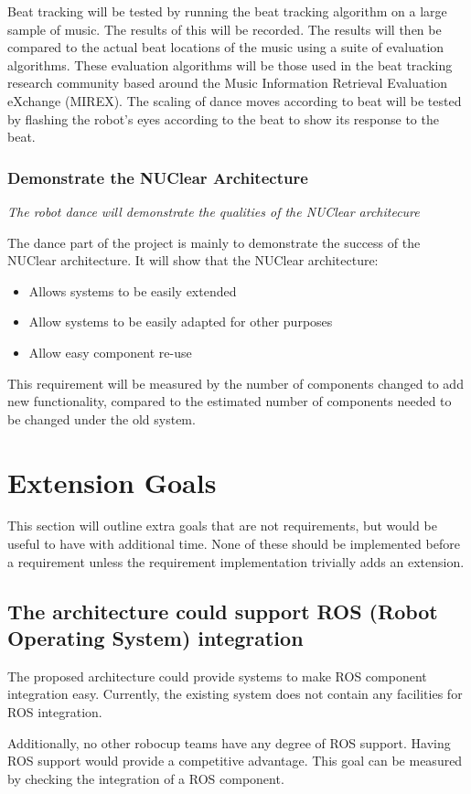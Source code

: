 \documentclass[english,12pt]{scrartcl}
\newcommand{\requirement}[1]{\textit{#1}}
\begin{document}
				Beat tracking will be tested by running the beat tracking algorithm on a large sample of music.
				The results of this will be recorded. The results will then be compared to the actual beat locations of the music using a suite of evaluation algorithms.
				These evaluation algorithms will be those used in the beat tracking research community based around the Music Information Retrieval Evaluation eXchange (MIREX).
				The scaling of dance moves according to beat will be tested by flashing the robot’s eyes according to the beat to show its response to the beat.
				
			\subsubsection{Demonstrate the NUClear Architecture}
				\requirement{The robot dance will demonstrate the qualities of the NUClear architecure}

				The dance part of the project is mainly to demonstrate the success of the NUClear architecture. It will show that the NUClear architecture:
				\begin{itemize}
					\item{Allows systems to be easily extended}
					\item{Allow systems to be easily adapted for other purposes}
					\item{Allow easy component re-use}
				\end{itemize}
				
				This requirement will be measured by the number of components changed to add new functionality, compared to the estimated number of components needed to be changed under the old system.

	\section{Extension Goals}
		This section will outline extra goals that are not requirements, but would be useful to have with additional time.
		None of these should be implemented before a requirement unless the requirement implementation trivially adds an extension.

		\subsection{The architecture could support ROS (Robot Operating System) integration}
			The proposed architecture could provide systems to make ROS component integration easy.
			Currently, the existing system does not contain any facilities for ROS integration.
			
			Additionally, no other \gls{robocup} teams have any degree of ROS support.
			Having ROS support would provide a competitive advantage.
			This goal can be measured by checking the integration of a ROS component.
	
	\printglossaries
\end{document}
